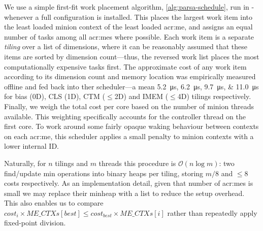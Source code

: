 We use a simple first-fit work placement algorithm, \cref{alg:parsa-schedule}, run in \approachshort{}-\Coopfw{} whenever a full configuration is installed.
This places the largest work item into the least loaded minion context of the least loaded \gls{acr:me}, and assigns an equal number of tasks among all \glspl{acr:me} where possible.
Each work item is a separate \emph{tiling} over a list of dimensions, where it can be reasonably assumed that these items are sorted by dimension count---thus, the reversed work list places the most computationally expensive tasks first.
The approximate cost of any work item according to its dimension count and memory location was empirically measured offline and fed back into ther scheduler---a mean \qtylist{5.2;6.2;9.7;11.0}{\micro\second} for bias (0D), CLS (1D), CTM ($\le$2D) and IMEM ($\le$4D) tilings respectively.
Finally, we weigh the total cost per core based on the number of minion threads available.
This weighting specifically accounts for the controller thread on the first core.
To work around some fairly opaque waking behaviour between contexts on each \gls{acr:me}, this scheduler applies a small penalty to minion contexts with a lower internal ID.

Naturally, for $n$ tilings and $m$ threads this procedure is $\mathcal{O}{\left(n\log{m}\right)}$: two find/update min operations into binary heaps per tiling, storing $m/8$ and $\le8$ costs respectively.
As an implementation detail, given that number of \glspl{acr:me} is small we may replace their minheap with a list to reduce the setup overhead.
This also enables us to compare $\textit{cost}_i \times \textit{ME\_CTXs}\left[\textit{best}\right] \le \textit{cost}_\textit{best} \times \textit{ME\_CTXs}\left[i\right]$ rather than repeatedly apply fixed-point division.


%

